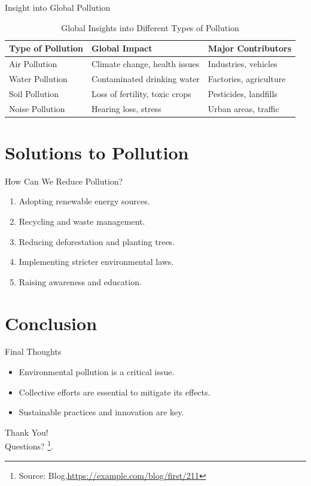 \documentclass{beamer}
\begin{document}
\begin{frame}{Insight into Global Pollution}
  \begin{table}[]
    \centering
    \setlength{\tabcolsep}{5pt} 
    \begin{tabular}{|p{}|p{}|p{}|}
      \hline
      \textbf{Type of Pollution} & \textbf{Global Impact} & \textbf{Major Contributors} \\
      \hline
      Air Pollution & Climate change, health issues & Industries, vehicles \\
      \hline
      Water Pollution & Contaminated drinking water & Factories, agriculture \\
      \hline
      Soil Pollution & Loss of fertility, toxic crops & Pesticides, landfills \\
      \hline
      Noise Pollution & Hearing loss, stress & Urban areas, traffic \\
      \hline
    \end{tabular}
    \caption{Global Insights into Different Types of Pollution}
  \end{table}
\end{frame}


\section{Solutions to Pollution}
\begin{frame}{How Can We Reduce Pollution?}
  \begin{enumerate}
    \item Adopting renewable energy sources.
    \item Recycling and waste management.
    \item Reducing deforestation and planting trees.
    \item Implementing stricter environmental laws.
    \item Raising awareness and education.
  \end{enumerate}
\end{frame}


\section{Conclusion}
\begin{frame}{Final Thoughts}
  \begin{itemize}
    \item Environmental pollution is a critical issue.
    \item Collective efforts are essential to mitigate its effects.
    \item Sustainable practices and innovation are key.
  \end{itemize}
\end{frame}

\begin{frame}
  \centering
  \LARGE{Thank You!} \vspace{1cm} \\
  \normalsize{Questions?}
  \footnote{Source: Blog,\url{https://example.com/blog/first/211}}.
\end{frame}
\end{document}

